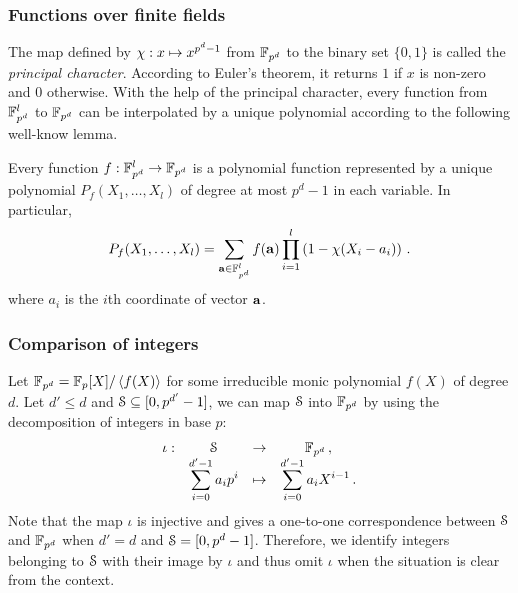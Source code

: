 \subsubsection{Functions over finite fields}\label{subsec:funcff}
The map defined by $\princhar: x \mapsto x^{p^d-1}$ from $\F_{p^d}$ to the binary set $\{0,1\}$ is called the \emph{principal character}. 
According to Euler's theorem, it returns $1$ if $x$ is non-zero and $0$ otherwise. 
With the help of the principal character, every function from $\F_{p^d}^l$ to $\F_{p^d}$ can be interpolated by a unique polynomial according to the following well-know lemma. 
\begin{lemma}\label{lem:interpolation}
  Every function $f: \F_{p^d}^l \rightarrow \F_{p^d}$ is a polynomial function represented by a unique polynomial $P_f(X_1,\dots,X_{l})$ of degree at most $p^d - 1$ in each variable.
  In particular,
  \begin{align*}
    P_f(X_1,\dots,X_{l}) = \sum_{\va \in \F^l_{p^d}} f(\va) \prod_{i=1}^{l} \left(1 - \princhar(X_i - a_i)\right)\,.
  \end{align*}
  where $a_i$ is the $i$th coordinate of vector $\va$. 
\end{lemma}

\subsubsection{Comparison of integers}
  Let $\F_{p^d} = \F_p[X]/\ideal{f(X)}$ for some irreducible monic polynomial $f(X)$ of degree $d$.
  Let $d'\leq d$ and $\S \subseteq [0,p^{d'}-1]$, we can map $\S$ into $\F_{p^d}$ by using the decomposition of integers in base $p$:
  $$\begin{array}{cccc}
      \iota : & \S & \rightarrow & \F_{p^d}\,, \\
              & \displaystyle\sum_{i=0}^{d'-1}a_ip^i & \mapsto & \displaystyle\sum_{i=0}^{d'-1}a_i X^{i-1}\,. 
    \end{array}$$
  Note that the map $\iota$ is injective and gives a one-to-one correspondence between $\S$ and $\F_{p^{d}}$ when $d'=d$ and $\S = [0,p^d-1]$. 
  Therefore, we identify integers belonging to $\S$ with their image by $\iota$ and thus omit $\iota$ when the situation is clear from the context.

